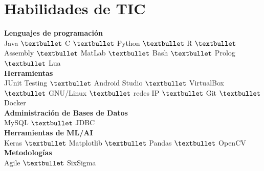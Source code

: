 \documentclass[letterpaper]{cv} %
\begin{document}
\section{Habilidades de TIC}
\textbf{Lenguajes de programación}\\
\vspace{5pt}
Java $\textbullet$ C $\textbullet$ Python $\textbullet$ R $\textbullet$ Assembly $\textbullet$ MatLab $\textbullet$ Bash $\textbullet$ Prolog $\textbullet$ Lua\\
\textbf{Herramientas}\\
\vspace{5pt}
JUnit Testing $\textbullet$ Android Studio $\textbullet$ VirtualBox $\textbullet$ GNU/Linux $\textbullet$ redes IP $\textbullet$ Git $\textbullet$ Docker\\
\textbf{Administración de Bases de Datos}\\
\vspace{5pt}
MySQL $\textbullet$ JDBC\\
\textbf{Herramientas de ML/AI}\\
\vspace{5pt}
Keras $\textbullet$ Matplotlib $\textbullet$ Pandas $\textbullet$ OpenCV\\
\textbf{Metodologías}\\
Agile $\textbullet$ SixSigma\\

\end{document}
